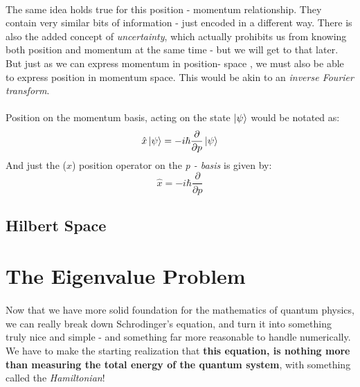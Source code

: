 \documentclass[12pt,letterpaper]{book}
\begin{document}
\paragraph*{}The same idea holds true for this position - momentum relationship. They contain very similar bits of information - just encoded in a different way. There is also the added concept of \textit{uncertainty}, which actually prohibits us from knowing both position and momentum at the same time - but we will get to that later. But just as we can express momentum in position- space , we must also be able to express position in momentum space. This would be akin to an \textit{inverse Fourier transform}.
\paragraph*{}Position on the momentum basis, acting on the state $\ket{\psi}$ would be notated as:
\begin{equation}
\label{position on psi}
\hat{x}\ket{\psi} = -i\hbar\frac{\partial}{\partial p}\ket{\psi}
\end{equation}
And just the ($x$) position operator on the \textit{p - basis} is given by:
\begin{equation}
\label{position}
\hat{x} = -i\hbar\frac{\partial}{\partial p}
\end{equation}


\subsection*{Hilbert Space}
 

\section{The Eigenvalue Problem}
\paragraph*{}Now that we have more solid foundation for the mathematics of quantum physics, we can really break down Schrodinger's equation, and turn it into something truly nice and simple - and something far more reasonable to handle numerically. We have to make the starting realization that \textbf{this equation, is nothing more than measuring the total energy of the quantum system}, with something called the \textit{Hamiltonian}! 
\end{document}
